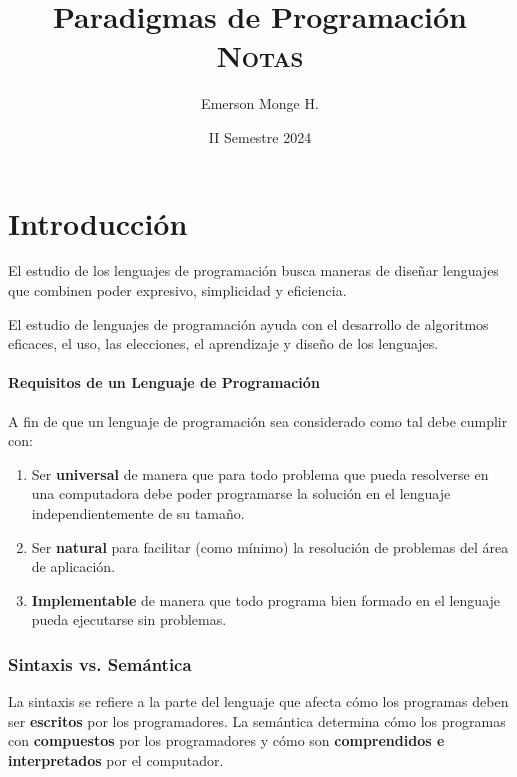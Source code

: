 \documentclass{report}
\title{Paradigmas de Programación\\
\textsc{Notas}}
\author{Emerson Monge H.}
\date{II Semestre 2024}
\theoremstyle{mytheoremstyle}
\theoremstyle{mytheoremstyle}
\theoremstyle{myproblemstyle}
\newcommand{\cNLCh}[1]{
    \chapter*{#1}
    \addcontentsline{toc}{chapter}{#1}
    \addtocounter{chapter}{1}
    \setcounter{section}{0}
}
\begin{document}
    
    \renewcommand{\chaptername}{Capítulo}
    \renewcommand{\contentsname}{Contenidos}
    
    \maketitle
    
    \tableofcontents
    
    
    \cNLCh{Introducción}

    El estudio de los lenguajes de programación busca maneras de diseñar lenguajes que combinen poder expresivo, simplicidad y eficiencia.

    El estudio de lenguajes de programación ayuda con el desarrollo de algoritmos eficaces, el uso, las elecciones, el aprendizaje y diseño de los lenguajes.

    \subsubsection*{Requisitos de un Lenguaje de Programación}

    A fin de que un lenguaje de programación sea considerado como tal debe cumplir con:

    \begin{enumerate}
        \item Ser \textbf{universal} de manera que para todo problema que pueda resolverse en una computadora debe poder programarse la solución en el lenguaje independientemente de su tamaño.
        
        \item Ser \textbf{natural} para facilitar (como mínimo) la resolución de problemas del área de aplicación.
        
        \item \textbf{Implementable} de manera que todo programa bien formado en el lenguaje pueda ejecutarse sin problemas.
    \end{enumerate}
    
    \subsection*{Sintaxis vs. Semántica}

    La sintaxis se refiere a la parte del lenguaje que afecta cómo los programas deben ser \textbf{escritos} por los programadores. La semántica determina cómo los programas con \textbf{compuestos} por los programadores y cómo son \textbf{comprendidos e interpretados} por el computador.
\end{document}
